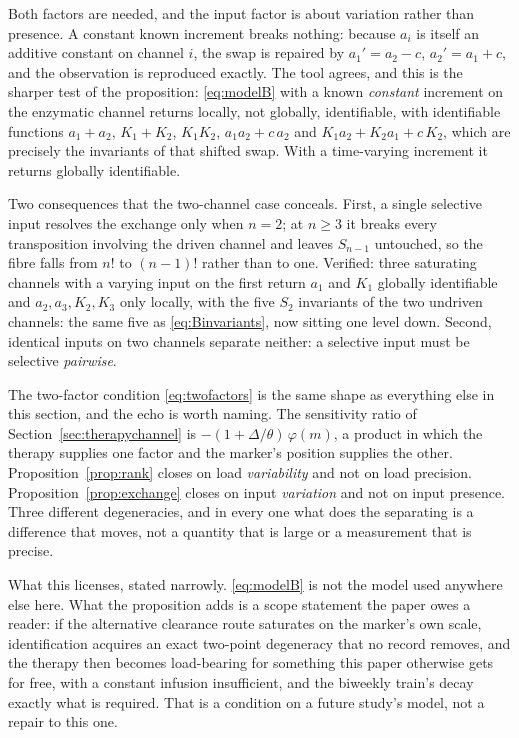 Both factors are needed, and the input factor is about variation rather than
presence. A constant known increment breaks nothing: because $a_i$ is itself an additive
constant on channel $i$, the swap is repaired by $a_1' = a_2 - c$, $a_2' = a_1 + c$, and
the observation is reproduced exactly. The tool agrees, and this is the sharper test of the
proposition: \eqref{eq:modelB} with a known \emph{constant} increment on the enzymatic
channel returns locally, not globally, identifiable, with identifiable functions
$a_1+a_2$, $K_1+K_2$, $K_1K_2$, $a_1a_2 + c\,a_2$ and $K_1a_2 + K_2a_1 + c\,K_2$, which are
precisely the invariants of that shifted swap. With a time-varying increment it returns
globally identifiable.

Two consequences that the two-channel case conceals. First, a single selective
input resolves the exchange only when $n = 2$; at $n \ge 3$ it breaks every transposition
involving the driven channel and leaves $S_{n-1}$ untouched, so the fibre falls from $n!$
to $(n-1)!$ rather than to one. Verified: three saturating channels with a varying input on
the first return $a_1$ and $K_1$ globally identifiable and $a_2, a_3, K_2, K_3$ only
locally, with the five $S_2$ invariants of the two undriven channels: the same five as
\eqref{eq:Binvariants}, now sitting one level down. Second, identical inputs on two
channels separate neither: a selective input must be selective \emph{pairwise}.

The two-factor condition \eqref{eq:twofactors} is the same shape as everything else
in this section, and the echo is worth naming. The sensitivity ratio of
Section~\ref{sec:therapychannel} is $-(1 + \Delta/\theta)\,\varphi(m)$, a product in which
the therapy supplies one factor and the marker's position supplies the other.
Proposition~\ref{prop:rank} closes on load \emph{variability} and not on load precision.
Proposition~\ref{prop:exchange} closes on input \emph{variation} and not on input presence.
Three different degeneracies, and in every one what does the separating is a
difference that moves, not a quantity that is large or a measurement that is precise.

What this licenses, stated narrowly. \eqref{eq:modelB} is not the model used
anywhere else here. What the proposition adds is a scope statement the paper owes a reader:
if the alternative clearance route saturates on the marker's own scale, identification
acquires an exact two-point degeneracy that no record removes, and the therapy then becomes
load-bearing for something this paper otherwise gets for free, with a constant infusion
insufficient, and the biweekly train's decay exactly what is required. That is a condition
on a future study's model, not a repair to this one.


